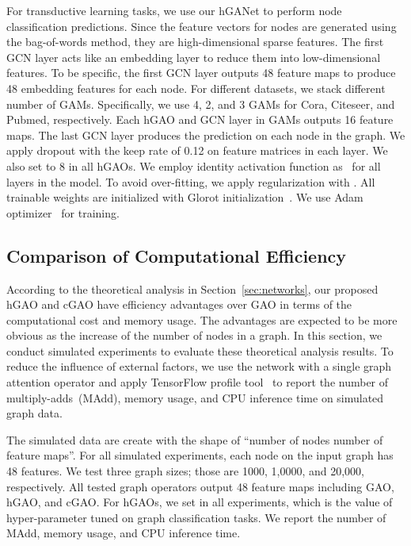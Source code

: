 \documentclass[sigconf]{acmart}
\begin{document}
For transductive learning tasks, we use our hGANet to perform node
classification predictions. Since the feature vectors for nodes are generated using the
bag-of-words method, they are high-dimensional sparse features. The first GCN
layer acts like an embedding layer to reduce them into low-dimensional
features. To be specific, the first GCN layer outputs 48 feature maps to
produce 48 embedding features for each node. For different datasets, we stack
different number of GAMs. Specifically, we use 4, 2, and 3 GAMs for Cora,
Citeseer, and Pubmed, respectively. Each hGAO and GCN layer in GAMs outputs
16 feature maps. The last GCN layer produces the prediction on each node in
the graph. We apply dropout with the keep rate of 0.12 on feature matrices in
each layer. We also set  to 8 in all hGAOs. We employ identity
activation function as~\cite{gao2018large} for all layers in the model. To
avoid over-fitting, we apply  regularization with . All
trainable weights are initialized with Glorot
initialization~\cite{glorot2010understanding}. We use Adam
optimizer~\cite{kingma2014adam} for training.

\subsection{Comparison of Computational Efficiency}

According to the theoretical analysis in Section~\ref{sec:networks}, our
proposed hGAO and cGAO have efficiency advantages over GAO in terms of the
computational cost and memory usage. The advantages are expected to be more
obvious as the increase of the number of nodes in a graph. In this section, we
conduct simulated experiments to evaluate these theoretical analysis results.
To reduce the influence of external factors, we use the network with a single
graph attention operator and apply TensorFlow profile
tool~\cite{abadi2016tensorflow} to report the number of multiply-adds~(MAdd),
memory usage, and CPU inference time on simulated graph data.

The simulated data are create with the shape of ``number of nodes 
number of feature maps''. For all simulated experiments, each node on the
input graph has 48 features. We test three graph sizes; those are 1000,
1,0000, and 20,000, respectively. All tested graph operators output 48 feature
maps including GAO, hGAO, and cGAO. For hGAOs, we set  in all
experiments, which is the value of hyper-parameter  tuned on graph
classification tasks. We report the number of MAdd, memory usage, and CPU
inference time.
\end{document}
